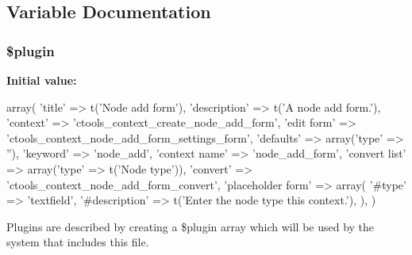 \subsection{Variable Documentation}
\hypertarget{node__add__form_8inc_ada8a7130088351710bb02ed622d6bf65}{
\subsubsection[{\$plugin}]{\setlength{\rightskip}{0pt plus 5cm}\$plugin}}
\label{node__add__form_8inc_ada8a7130088351710bb02ed622d6bf65}
{\bfseries Initial value:}
\begin{DoxyCode}
 array(
  'title' => t('Node add form'),
  'description' => t('A node add form.'),
  'context' => 'ctools_context_create_node_add_form',
  'edit form' => 'ctools_context_node_add_form_settings_form',
  'defaults' => array('type' => ''),
  'keyword' => 'node_add',
  'context name' => 'node_add_form',
  'convert list' => array('type' => t('Node type')),
  'convert' => 'ctools_context_node_add_form_convert',
  'placeholder form' => array(
    '#type' => 'textfield',
    '#description' => t('Enter the node type this context.'),
  ),
)
\end{DoxyCode}
Plugins are described by creating a \$plugin array which will be used by the system that includes this file. 